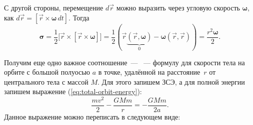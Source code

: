 С другой стороны, перемещение $d\vec{r}$ можно выразить через угловую скорость $\boldsymbol{\omega}$, как $d \vec{r} = [\vec{r} \times \boldsymbol{\omega} \,d t]$. Тогда
\begin{equation*}
    \boldsymbol{\sigma}
    = \frac{1}{2} \big[ \vec{r} \times [\vec{r} \times \boldsymbol{\omega} ]\big]
    = \frac{1}{2} \left(\vec{r} \underbrace{(\vec{r}, \boldsymbol{\omega})}_0 - \boldsymbol{\omega} ( \vec{r}, \vec{r} ) \right)
    = \frac{r^2 \boldsymbol{\omega}}{2}.
\end{equation*}

Получим еще одно важное соотношение~--- ~--- формулу для скорости тела на орбите с большой полуосью $a$ в точке, удалённой на расстояние~$r$ от центрального тела с массой $M$. Для этого запишем ЗСЭ, а для полной энергии запишем выражение (\ref{eq:total-orbit-energy}):
\begin{equation*}
	\frac{mv^2}{2} - \frac{GMm}{r} = -\frac{GMm}{2a}.
\end{equation*}
Данное выражение можно переписать в следующем виде:
